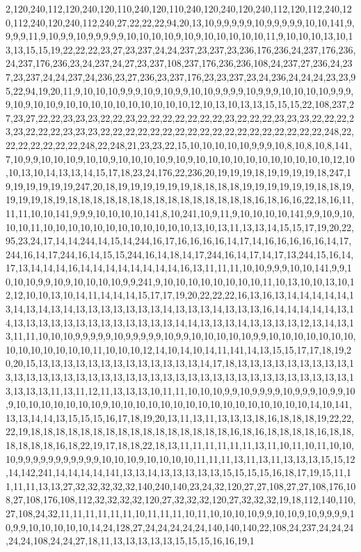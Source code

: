 2,120,240,112,120,240,120,110,240,120,110,240,120,240,120,240,112,120,112,240,120,112,240,120,240,112,240,27,22,22,22,94,20,13,10,9,9,9,9,9,10,9,9,9,9,9,10,10,141,9,9,9,9,11,9,10,9,9,10,9,9,9,9,9,10,10,10,10,9,10,9,10,10,10,10,10,11,9,10,10,10,13,10,13,13,15,15,19,22,22,22,23,27,23,237,24,24,237,23,237,23,236,176,236,24,237,176,236,24,237,176,236,23,24,237,24,27,23,237,108,237,176,236,236,108,24,237,27,236,24,237,23,237,24,24,237,24,236,23,27,236,23,237,176,23,23,237,23,24,236,24,24,24,23,23,95,22,94,19,20,11,9,10,10,10,9,9,9,10,9,10,9,9,10,10,9,9,9,9,10,9,9,9,10,10,10,10,9,9,9,9,10,9,10,10,9,10,10,10,10,10,10,10,10,10,10,12,10,13,10,13,13,15,15,15,22,108,237,27,23,27,22,22,23,23,23,22,22,23,22,22,22,22,22,22,22,23,22,22,22,23,23,23,22,22,22,23,23,22,22,22,23,23,23,22,22,22,22,22,22,22,22,22,22,22,22,22,22,22,22,22,22,248,22,22,22,22,22,22,22,248,22,248,21,23,23,22,15,10,10,10,10,10,9,9,9,10,8,10,8,10,8,141,7,10,9,9,10,10,10,9,10,10,9,10,10,10,10,9,10,9,10,10,10,10,10,10,10,10,10,10,10,12,10,10,13,10,14,13,13,14,15,17,18,23,24,176,22,236,20,19,19,19,18,19,19,19,19,18,247,19,19,19,19,19,19,247,20,18,19,19,19,19,19,19,18,18,18,18,19,19,19,19,19,19,18,18,19,19,19,19,18,19,18,18,18,18,18,18,18,18,18,18,18,18,18,18,18,16,18,16,16,22,18,16,11,11,11,10,10,141,9,9,9,10,10,10,10,141,8,10,241,10,9,11,9,10,10,10,10,141,9,9,10,9,10,10,10,11,10,10,10,10,10,10,10,10,10,10,10,10,13,10,13,11,13,13,14,15,15,17,19,20,22,95,23,24,17,14,14,244,14,15,14,244,16,17,16,16,16,16,14,17,14,16,16,16,16,16,14,17,244,16,14,17,244,16,14,15,15,244,16,14,18,14,17,244,16,14,17,14,17,13,244,15,16,14,17,13,14,14,14,16,14,14,14,14,14,14,14,14,16,13,11,11,11,10,10,9,9,9,10,10,141,9,9,10,10,10,9,9,10,9,10,10,10,10,9,9,241,9,10,10,10,10,10,10,10,10,11,10,13,10,10,13,10,12,12,10,10,13,10,14,11,14,14,14,15,17,17,19,20,22,22,22,16,13,16,13,14,14,14,14,14,13,14,13,14,13,14,13,13,13,13,13,13,13,14,13,13,13,14,13,13,13,16,14,14,14,14,14,13,14,13,13,13,13,13,13,13,13,13,13,13,13,13,14,14,13,13,13,14,13,13,13,13,12,13,14,13,13,11,11,10,10,10,9,9,9,9,9,10,9,9,9,9,9,10,9,9,10,10,10,10,10,9,9,10,10,10,10,10,10,10,10,10,10,10,10,10,10,11,10,10,10,12,14,10,14,10,14,11,141,14,13,15,15,17,17,18,19,20,20,15,13,13,13,13,13,13,13,13,13,13,13,13,13,14,17,18,13,13,13,13,13,13,13,13,13,13,13,13,13,13,13,13,13,13,13,13,13,13,13,13,13,13,13,13,13,13,13,13,13,13,13,13,13,13,13,13,13,11,13,11,12,11,13,13,13,10,11,11,10,10,10,9,9,10,9,9,9,9,10,9,9,9,10,9,9,10,9,10,10,10,10,10,10,10,9,10,10,10,10,10,10,10,10,10,10,10,10,10,10,10,10,14,10,141,13,13,14,14,13,15,15,15,16,17,18,19,20,13,11,13,11,13,13,13,18,16,18,18,18,19,22,22,22,19,18,18,18,18,18,18,18,18,18,18,18,18,18,18,18,18,16,18,16,18,18,18,18,16,18,18,18,18,18,18,16,18,22,19,17,18,18,22,18,13,11,11,11,11,11,11,13,11,10,11,10,11,10,10,10,9,9,9,9,9,9,9,9,9,9,9,10,10,10,9,10,10,10,10,11,11,11,13,11,13,11,13,13,13,15,15,12,14,142,241,14,14,14,14,141,13,13,14,13,13,13,13,13,15,15,15,15,16,18,17,19,15,11,11,11,11,13,13,27,32,32,32,32,32,140,240,140,23,24,32,120,27,27,108,27,27,108,176,108,27,108,176,108,112,32,32,32,32,120,27,32,32,32,120,27,32,32,32,19,18,112,140,110,27,108,24,32,11,11,11,11,11,11,10,11,11,11,10,11,10,10,10,10,9,9,10,10,9,10,9,9,9,9,10,9,9,10,10,10,10,10,14,24,128,27,24,24,24,24,24,140,140,140,22,108,24,237,24,24,24,24,24,108,24,24,27,18,11,13,13,13,13,13,15,15,15,16,16,19,1